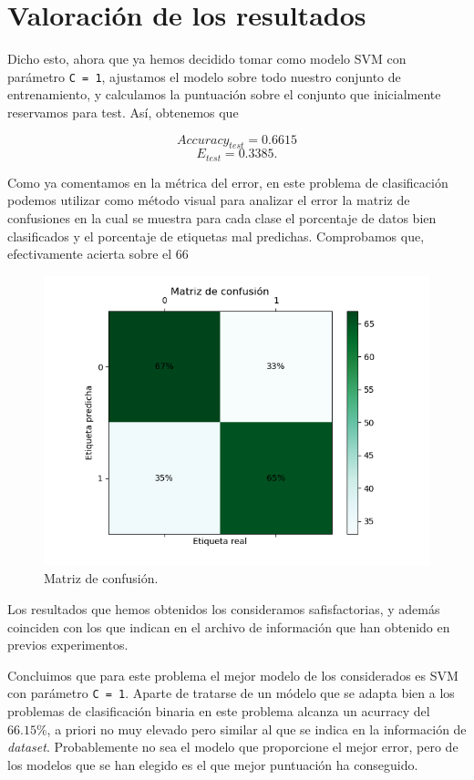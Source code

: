 \documentclass[size=a4, parskip=half, titlepage=false, toc=flat, toc=bib, 12pt]{scrartcl}
\begin{document}
\section{Valoración de los resultados}

Dicho esto, ahora que ya hemos decidido tomar como modelo SVM con parámetro \texttt{C = 1}, ajustamos el modelo sobre todo nuestro conjunto de entrenamiento, y calculamos la puntuación sobre el conjunto que inicialmente reservamos para test. Así, obtenemos que

\[
Accuracy_{test} = 0.6615
\]
\[
E_{test} = 0.3385
.\]

Como ya comentamos en la métrica del error, en este problema de clasificación podemos utilizar como método visual para analizar el error la matriz de confusiones en la cual se muestra para cada clase el porcentaje de datos bien clasificados y el porcentaje de etiquetas mal predichas. Comprobamos que, efectivamente acierta sobre el 66%
\begin{figure}[H]
\centering
\includegraphics[width=1\textwidth]{./img/matrizconfusion}
\caption{Matriz de confusión.}
\end{figure}
Los resultados que hemos obtenidos los consideramos safisfactorias, y además coinciden con los que indican en el archivo de información que han obtenido en previos experimentos.

Concluimos que para este problema el mejor modelo de los considerados es SVM con parámetro \texttt{C = 1}. Aparte de tratarse de un módelo que se adapta bien a los problemas de clasificación binaria en este problema alcanza un acurracy del $66.15\%$, a priori no muy elevado pero similar al que se indica en la información de \textit{dataset}. Probablemente no sea el
modelo que proporcione el mejor error, pero de los modelos que se han elegido es el que mejor puntuación ha conseguido.

\end{document}

